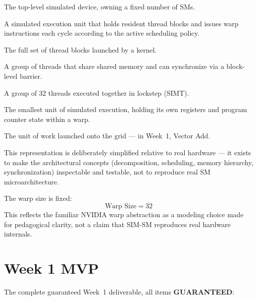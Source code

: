 \documentclass[11pt]{article}
\newcommand{\guaranteed}{\textcolor{accentgreen}{\textbf{GUARANTEED}}}
\begin{document}
\begin{description}[leftmargin=1.2cm, style=nextline]
  \item[GPU] The top-level simulated device, owning a fixed number of SMs.
  \item[SM (Streaming Multiprocessor)] A simulated execution unit that
  holds resident thread blocks and issues warp instructions each cycle
  according to the active scheduling policy.
  \item[Grid] The full set of thread blocks launched by a kernel.
  \item[Thread Block] A group of threads that share shared memory and can
  synchronize via a block-level barrier.
  \item[Warp] A group of 32 threads executed together in lockstep (SIMT).
  \item[Thread] The smallest unit of simulated execution, holding its own
  registers and program counter state within a warp.
  \item[Kernel] The unit of work launched onto the grid --- in Week~1,
  Vector Add.
\end{description}

This representation is deliberately simplified relative to real hardware
--- it exists to make the architectural concepts (decomposition,
scheduling, memory hierarchy, synchronization) inspectable and testable,
not to reproduce real SM microarchitecture.

The warp size is fixed:
\[
\text{Warp Size} = 32
\]
This reflects the familiar NVIDIA warp abstraction as a modeling choice
made for pedagogical clarity, not a claim that SIM-SM reproduces real
hardware internals.

\section{Week 1 MVP}

\begin{center}
\end{center}

The complete guaranteed Week~1 deliverable, all items \guaranteed{}:
\end{document}
